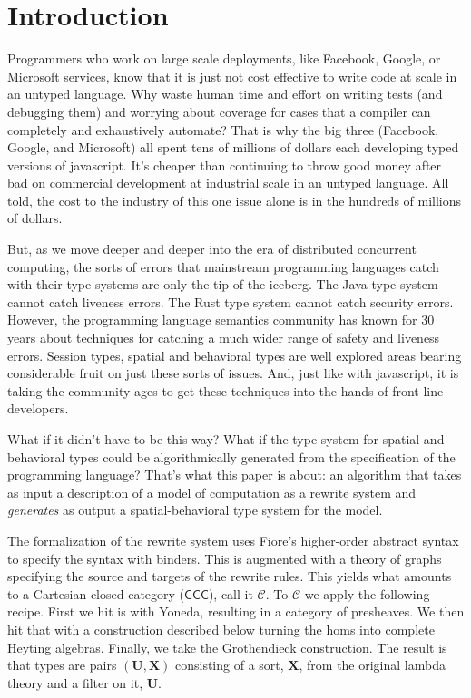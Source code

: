\section{Introduction}\label{sec:introduction} %

Programmers who work on large scale deployments, like Facebook,
Google, or Microsoft services, know that it is just not cost effective
to write code at scale in an untyped language. Why waste human time
and effort on writing tests (and debugging them) and worrying about
coverage for cases that a compiler can completely and exhaustively
automate? That is why the big three (Facebook, Google, and Microsoft)
all spent tens of millions of dollars each developing typed versions
of javascript. It's cheaper than continuing to throw good money
after bad on commercial development at industrial scale in an
untyped language. All told, the cost to the industry of this one issue
alone is in the hundreds of millions of dollars.

But, as we move deeper and deeper into the era of distributed
concurrent computing, the sorts of errors that mainstream programming
languages catch with their type systems are only the tip of the
iceberg. The Java type system cannot catch liveness errors. The Rust
type system cannot catch security errors. However, the programming
language semantics community has known for 30 years about techniques
for catching a much wider range of safety and liveness errors. Session
types, spatial and behavioral types are well explored areas bearing
considerable fruit on just these sorts of issues. And, just like with
javascript, it is taking the community ages to get these techniques
into the hands of front line developers.

What if it didn't have to be this way? What if the type system for
spatial and behavioral types could be algorithmically generated from
the specification of the programming language? That's what this paper
is about: an algorithm that takes as input a description of a model of
computation as a rewrite system and \emph{generates} as output a
spatial-behavioral type system for the model.

The formalization of the rewrite system uses Fiore's higher-order
abstract syntax to specify the syntax with binders. This is augmented
with a theory of graphs specifying the source and targets of the
rewrite rules. This yields what amounts to a Cartesian closed category
($\mathsf{CCC}$), call it $\mathcal{C}$. To $\mathcal{C}$ we apply the
following recipe. First we hit is with Yoneda, resulting in a category
of presheaves. We then hit that with a construction described below
turning the homs into complete Heyting algebras. Finally, we take the
Grothendieck construction. The result is that types are pairs
$(\mathbf{U}, \mathbf{X})$ consisting of a sort, $\mathbf{X}$, from
the original lambda theory and a filter on it, $\mathbf{U}$.

